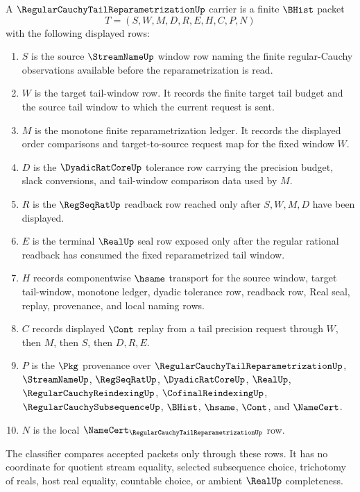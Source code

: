 \begin{definition}
\label{def:regular-cauchy-tail-reparametrization-carrier}
A $\RegularCauchyTailReparametrizationUp$ carrier is a finite $\BHist$ packet
$$
T=(S,W,M,D,R,E,H,C,P,N)
$$
with the following displayed rows:
\begin{enumerate}
\item $S$ is the source $\StreamNameUp$ window row naming the finite regular-Cauchy observations available before the reparametrization is read.
\item $W$ is the target tail-window row. It records the finite target tail budget and the source tail window to which the current request is sent.
\item $M$ is the monotone finite reparametrization ledger. It records the displayed order comparisons and target-to-source request map for the fixed window $W$.
\item $D$ is the $\DyadicRatCoreUp$ tolerance row carrying the precision budget, slack conversions, and tail-window comparison data used by $M$.
\item $R$ is the $\RegSeqRatUp$ readback row reached only after $S,W,M,D$ have been displayed.
\item $E$ is the terminal $\RealUp$ seal row exposed only after the regular rational readback has consumed the fixed reparametrized tail window.
\item $H$ records componentwise $\hsame$ transport for the source window, target tail-window, monotone ledger, dyadic tolerance row, readback row, Real seal, replay, provenance, and local naming rows.
\item $C$ records displayed $\Cont$ replay from a tail precision request through $W$, then $M$, then $S$, then $D,R,E$.
\item $P$ is the $\Pkg$ provenance over $\RegularCauchyTailReparametrizationUp$, $\StreamNameUp$, $\RegSeqRatUp$, $\DyadicRatCoreUp$, $\RealUp$, $\RegularCauchyReindexingUp$, $\CofinalReindexingUp$, $\RegularCauchySubsequenceUp$, $\BHist$, $\hsame$, $\Cont$, and $\NameCert$.
\item $N$ is the local $\NameCert_{\RegularCauchyTailReparametrizationUp}$ row.
\end{enumerate}
The classifier compares accepted packets only through these rows. It has no coordinate for quotient stream equality, selected subsequence choice, trichotomy of reals, host real equality, countable choice, or ambient $\RealUp$ completeness.
\end{definition}

